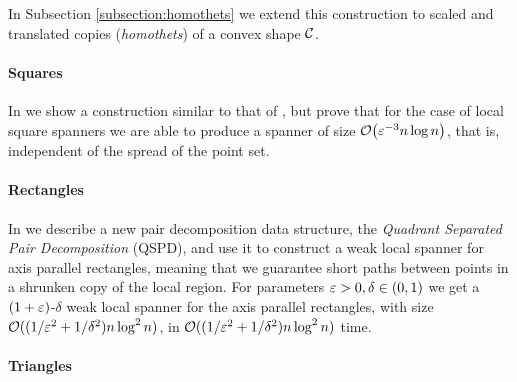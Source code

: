\documentclass[12pt]{article}%
\begin{document}
In Subsection \ref{subsection:homothets} we extend this construction to scaled and translated copies (\emph{homothets}) of a convex shape $\mathcal{C}$.

\paragraph{Squares}

In  we show a construction similar to that of , but prove that for the case of local square spanners we are able to produce a spanner of size $\Of\pth{\eps^{-3} n \log n}$, that is, independent of the spread of the point set. 

\paragraph{Rectangles}

In  we describe a new pair decomposition data structure, the \emph{Quadrant Separated Pair Decomposition} (QSPD), and use it to construct a weak local spanner for axis parallel rectangles, meaning that we guarantee short paths between points in a shrunken copy of the local region. For parameters $\varepsilon>0, \delta\in (0,1)$ we get a $(1+\varepsilon)$-$\delta$ weak local spanner for the axis parallel rectangles, with size $\mathcal{O}((1/\varepsilon^2 + 1/\delta^2) n \log^2 n)$, in $\mathcal{O}((1/\varepsilon^2 + 1/\delta^2) n \log^2 n)$ time.

\paragraph{Triangles}
\end{document}
